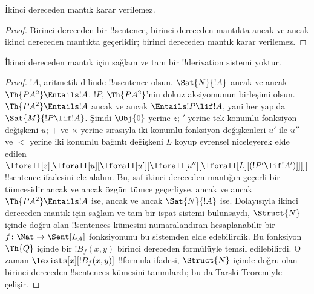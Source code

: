 \documentclass[../../../include/open-logic-section]{subfiles}
\begin{document}



\begin{thm}
İkinci dereceden mantık karar verilemez.
\end{thm}

\begin{proof}
Birinci dereceden bir !!{sentence}, birinci dereceden mantıkta ancak ve ancak
ikinci dereceden mantıkta geçerlidir; birinci dereceden mantık karar
verilemez.
\end{proof}

\begin{thm}
İkinci dereceden mantık için sağlam ve tam bir !!{derivation} sistemi yoktur.
\end{thm}

\begin{proof}
$!A$, aritmetik dilinde !!a{sentence} olsun. $\Sat{N}{!A}$ ancak ve ancak
$\Th{PA^2}\Entails !A$. $!P$, $\Th{PA^2}$'nin dokuz aksiyomunun birleşimi
olsun. $\Th{PA^2}\Entails !A$ ancak ve ancak $\Entails !P\lif !A$, yani
her yapıda $\Sat{M}{!P\lif !A}$. Şimdi $\Obj{0}$ yerine $z$; $\prime$ yerine tek
konumlu fonksiyon değişkeni $u$; $+$ ve $\times$ yerine sırasıyla iki
konumlu fonksiyon değişkenleri $u'$ ile $u''$ ve $<$ yerine iki konumlu
bağıntı değişkeni $L$ koyup evrensel niceleyerek elde edilen
$\lforall[z][\lforall[u][\lforall[u'][\lforall[u''][\lforall[L][(!P' \lif !A')]]]]]$
!!{sentence} ifadesini ele alalım. Bu, saf ikinci dereceden mantığın geçerli bir
tümcesidir ancak ve ancak özgün tümce geçerliyse, ancak ve ancak
$\Th{PA^2}\Entails !A$ ise, ancak ve ancak $\Sat{N}{!A}$ ise. Dolayısıyla
ikinci dereceden mantık için sağlam ve tam bir ispat sistemi bulunsaydı,
$\Struct{N}$ içinde doğru olan !!{sentence}s kümesini numaralandıran
hesaplanabilir bir $f\colon\Nat\to\Sent[L_A]$ fonksiyonunu bu sistemden elde
edebilirdik. Bu fonksiyon $\Th{Q}$ içinde bir $!B_f(x,y)$ birinci dereceden
formülüyle temsil edilebilirdi. O zaman $\lexists[x][!B_f(x,y)]$
!!{formula} ifadesi, $\Struct{N}$ içinde doğru olan birinci dereceden
!!{sentence}s kümesini tanımlardı; bu da Tarski Teoremiyle çelişir.
\end{proof}
\end{document}
